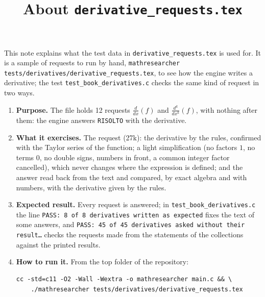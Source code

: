 \documentclass[11pt,a4paper]{article}
\title{About \texttt{derivative\_requests.tex}}
\author{}
\date{}
\begin{document}
\maketitle
This note explains what the test data in \texttt{derivative\_requests.tex} is used for. It is a sample of requests to run by hand, \texttt{mathresearcher tests/derivatives/derivative\_requests.tex}, to see how the engine writes a derivative; the test \texttt{test\_book\_derivatives.c} checks the same kind of request in two ways.

\begin{enumerate}
\item \textbf{Purpose.} The file holds 12 requests $\frac{d}{dx}\left( f \right)$ and $\frac{d^{k}}{dx^{k}}\left( f \right)$, with nothing after them: the engine answers \texttt{RISOLTO} with the derivative.

\item \textbf{What it exercises.} The request (27k): the derivative by the rules, confirmed with the Taylor series of the function; a light simplification (no factors $1$, no terms $0$, no double signs, numbers in front, a common integer factor cancelled), which never changes where the expression is defined; and the answer read back from the text and compared, by exact algebra and with numbers, with the derivative given by the rules.

\item \textbf{Expected result.} Every request is answered; in \texttt{test\_book\_derivatives.c} the line \texttt{PASS: 8 of 8 derivatives written as expected} fixes the text of some answers, and \texttt{PASS: 45 of 45 derivatives asked without their result\ldots} checks the requests made from the statements of the collections against the printed results.

\item \textbf{How to run it.} From the top folder of the repository:
\begin{verbatim}
cc -std=c11 -O2 -Wall -Wextra -o mathresearcher main.c && \
    ./mathresearcher tests/derivatives/derivative_requests.tex
\end{verbatim}
\end{enumerate}
\end{document}
